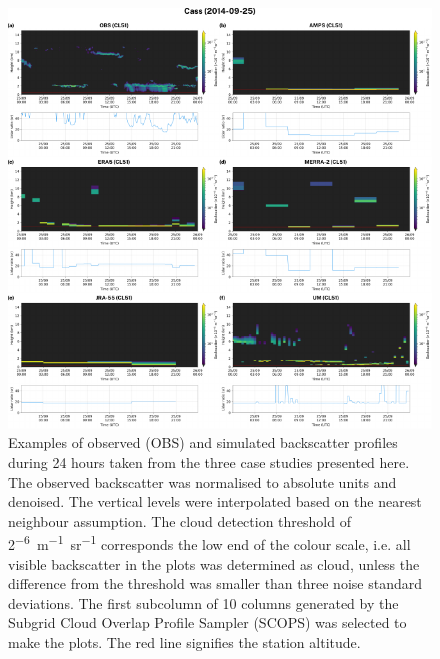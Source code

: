 \clearpage

\begin{figure}[t]
\centering
\includegraphics[width=\textwidth]{chapter3/fig/examples.pdf}
\caption[Examples of observed and simulated backscatter profiles]{
Examples of observed (OBS) and simulated backscatter profiles during 24 hours
taken from the three case studies presented here. The observed backscatter
was normalised to absolute units and denoised.
The vertical levels were interpolated based on the
nearest neighbour assumption. The cloud detection threshold of 2\unit{^{-6} m^{-1}sr^{-1}}
corresponds the low end of the colour scale, i.e. all visible backscatter
in the plots was determined as cloud, unless the difference from the threshold
was smaller than three noise standard deviations. The first subcolumn of
10 columns generated by the Subgrid Cloud Overlap Profile Sampler (SCOPS)
was selected to make the plots. The red line signifies the station altitude.
}
\label{fig:examples}
\end{figure}

\clearpage

